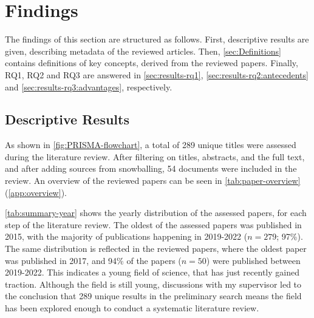 \section{Findings}
\label{sec:Results}
The findings of this section are structured as follows. First, descriptive results are given, describing metadata of the reviewed articles. Then, \autoref{sec:Definitions} contains definitions of key concepts, derived from the reviewed papers. Finally, RQ1, RQ2 and RQ3 are answered in \autoref{sec:results-rq1}, \ref{sec:results-rq2:antecedents} and \ref{sec:results-rq3:advantages}, respectively.

\subsection{Descriptive Results} %
\label{sec:results-descriptive}
As shown in \autoref{fig:PRISMA-flowchart}, a total of 289 unique titles were assessed during the literature review. After filtering on titles, abstracts, and the full text, and after adding sources from snowballing, 54 documents were included in the review. An overview of the reviewed papers can be seen in \autoref{tab:paper-overview} (\autoref{app:overview}).

\autoref{tab:summary-year} shows the yearly distribution of the assessed papers, for each step of the literature review. The oldest of the assessed papers was published in 2015, with the majority of publications happening in 2019-2022 ($n = 279$; 97\%). The same distribution is reflected in the reviewed papers, where the oldest paper was published in 2017, and 94\% of the papers ($n = 50$) were published between 2019-2022. This indicates a young field of science, that has just recently gained traction. Although the field is still young, discussions with my supervisor led to the conclusion that 289 unique results in the preliminary search means the field has been explored enough to conduct a systematic literature review.

